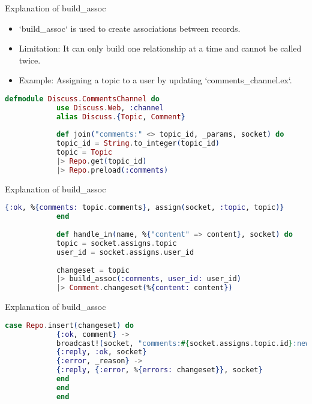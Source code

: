 \documentclass[aspectratio=169, table]{beamer}
\begin{document}
	\begin{frame}[fragile]{Explanation of build\_assoc}
		\begin{itemize}
			\item `build\_assoc` is used to create associations between records.
			\item Limitation: It can only build one relationship at a time and cannot be called twice.
			\item Example: Assigning a topic to a user by updating `comments\_channel.ex`.
		\end{itemize}
		
		\begin{lstlisting}[language=Elixir]
			defmodule Discuss.CommentsChannel do 
			use Discuss.Web, :channel
			alias Discuss.{Topic, Comment}
			
			def join("comments:" <> topic_id, _params, socket) do
			topic_id = String.to_integer(topic_id)
			topic = Topic 
			|> Repo.get(topic_id)
			|> Repo.preload(:comments)
		\end{lstlisting}
	\end{frame}
	
	\begin{frame}[fragile]{Explanation of build\_assoc}
		\begin{lstlisting}[language=Elixir]
			{:ok, %{comments: topic.comments}, assign(socket, :topic, topic)}
			end
			
			def handle_in(name, %{"content" => content}, socket) do
			topic = socket.assigns.topic
			user_id = socket.assigns.user_id
			
			changeset = topic
			|> build_assoc(:comments, user_id: user_id)
			|> Comment.changeset(%{content: content})
		\end{lstlisting}
	\end{frame}
	
	\begin{frame}[fragile]{Explanation of build\_assoc}
		\begin{lstlisting}[language=Elixir]
			case Repo.insert(changeset) do
			{:ok, comment} ->
			broadcast!(socket, "comments:#{socket.assigns.topic.id}:new", %{comment: comment})
			{:reply, :ok, socket} 
			{:error, _reason} ->
			{:reply, {:error, %{errors: changeset}}, socket}
			end
			end
			end
		\end{lstlisting}
	\end{frame}
\end{document}
